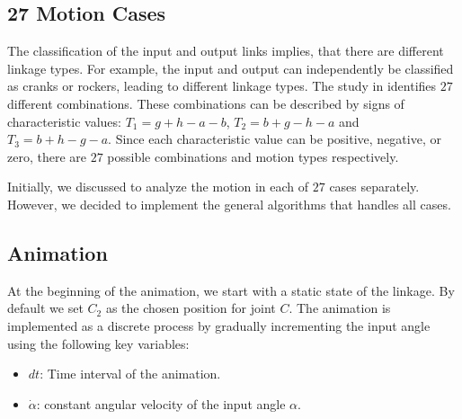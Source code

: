 \documentclass{article}
\begin{document}
 \subsection{27 Motion Cases}
 
 The classification of the input and output links implies, that there are different linkage types. For example, the input and output can independently be classified as cranks or rockers, leading to different linkage types. The study in \cite{inproceedings} identifies $27$ different combinations. These combinations can be described by signs of characteristic values: $T_1 = g + h - a - b$, $T_2 = b + g - h - a$ and $T_3 = b + h - g - a$. Since each characteristic value can be positive, negative, or zero, there are $27$ possible combinations and motion types respectively.
 
 Initially, we discussed to analyze the motion in each of $27$ cases separately. However, we decided to implement the general algorithms that handles all cases.
 

 \subsection{Animation}

 At the beginning of the animation, we start with a static state of the linkage. By default we set $C_2$ as the chosen position for joint $C$.
 The animation is implemented as a discrete process by gradually incrementing the input angle using the following key variables:
 \begin{itemize}
 	\item $dt$: Time interval of the animation.
 	\item $\dot{\alpha}$: constant angular velocity of the input angle $\alpha$.
 \end{itemize}
\end{document}
